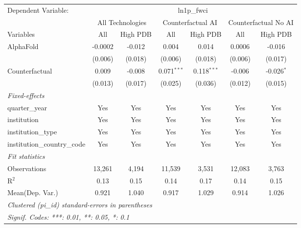 \begingroup
\centering
\begin{tabular}{lcccccc}
   \tabularnewline \midrule \midrule
   Dependent Variable: & \multicolumn{6}{c}{ln1p\_fwci}\\
 & \multicolumn{2}{c}{All Technologies} & \multicolumn{2}{c}{Counterfactual AI} & \multicolumn{2}{c}{Counterfactual No AI} \\
\cmidrule(lr){1-1}\cmidrule(lr){2-3} \cmidrule(lr){4-5} \cmidrule(lr){6-7}
Variables & \multicolumn{1}{c}{All} & \multicolumn{1}{c}{High PDB} & \multicolumn{1}{c}{All} & \multicolumn{1}{c}{High PDB} & \multicolumn{1}{c}{All} & \multicolumn{1}{c}{High PDB} \\
\cmidrule(lr){1-1}\cmidrule(lr){2-2} \cmidrule(lr){3-3} \cmidrule(lr){4-4} \cmidrule(lr){5-5} \cmidrule(lr){6-6} \cmidrule(lr){7-7}
   AlphaFold                    & -0.0002 & -0.012  & 0.004         & 0.014         & 0.0006  & -0.016\\   
                                & (0.006) & (0.018) & (0.006)       & (0.018)       & (0.006) & (0.017)\\   
   Counterfactual               & 0.009   & -0.008  & 0.071$^{***}$ & 0.118$^{***}$ & -0.006  & -0.026$^{*}$\\   
                                & (0.013) & (0.017) & (0.025)       & (0.036)       & (0.012) & (0.015)\\   
   \midrule
   \emph{Fixed-effects}\\
   quarter\_year                & Yes     & Yes     & Yes           & Yes           & Yes     & Yes\\  
   institution                  & Yes     & Yes     & Yes           & Yes           & Yes     & Yes\\  
   institution\_type            & Yes     & Yes     & Yes           & Yes           & Yes     & Yes\\  
   institution\_country\_code   & Yes     & Yes     & Yes           & Yes           & Yes     & Yes\\  
   \midrule
   \emph{Fit statistics}\\
   Observations                 & 13,261  & 4,194   & 11,539        & 3,531         & 12,083  & 3,763\\  
   R$^2$                        & 0.13    & 0.15    & 0.14          & 0.17          & 0.14    & 0.15\\  
Mean(Dep. Var.) & 0.921 & 1.040 & 0.917 & 1.029 & 0.914 & 1.026 \\
   \midrule \midrule
   \multicolumn{7}{l}{\emph{Clustered (pi\_id) standard-errors in parentheses}}\\
   \multicolumn{7}{l}{\emph{Signif. Codes: ***: 0.01, **: 0.05, *: 0.1}}\\
\end{tabular}
\par\endgroup
